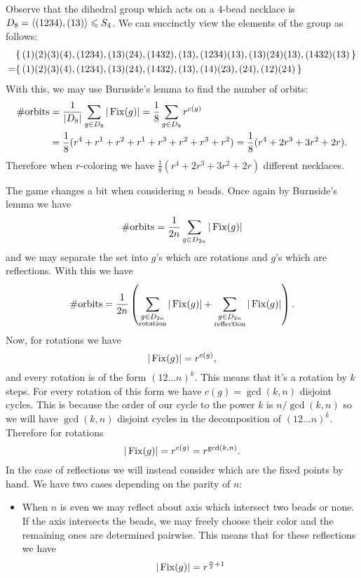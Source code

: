 \documentclass[12pt]{memoir}
\begin{document}
\begin{ptcbr}
 Observe that the dihedral group which acts on a $4$-bead necklace is $D_8=\left\langle (1234),(13)\right\rangle\leqslant S_4$. We can succinctly view the elements of the group as follows:
        \begin{align*}
            &\{\,(1)(2)(3)(4),(1234),(13)(24),(1432),(13),(1234)(13),(13)(24)(13),(1432)(13)\,\}\\
            =&\{\,(1)(2)(3)(4),(1234),(13)(24),(1432),(13),(14)(23),(24),(12)(24)\,\}
        \end{align*}
        With this, we may use Burnside's lemma to find the number of orbits:
        \begin{align*}
        \#\text{orbits}&=\frac{1}{|D_8|}\sum_{g\in D_{8}}|\operatorname{Fix}(g)|=\frac{1}{8}\sum_{g\in D_{8}}r^{c(g)}\\
        &=\frac{1}{8}(r^4+r^1+r^2+r^1+r^3+r^2+r^3+r^2)
        =\frac{1}{8}(r^4+2r^3+3r^2+2r).
        \end{align*}
Therefore when $r$-coloring we have $\frac{1}{8}(r^4+2r^3+3r^2+2r)$ different necklaces.\par 
The game changes a bit when considering $n$ beads. Once again by Burnside's lemma we have 
$$\#\text{orbits}=\frac{1}{2n}\sum_{g\in D_{2n}}|\operatorname{Fix}(g)|$$
and we may separate the set into $g$'s which are rotations and $g$'s which are reflections. With this we have 
$$\#\text{orbits}=\frac{1}{2n}\left(\sum_{\substack{g\in D_{2n}\\\text{rotation}}}|\operatorname{Fix}(g)|+\sum_{\substack{g\in D_{2n}\\\text{reflection}}}|\operatorname{Fix}(g)|\right).$$
Now, for rotations we have 
$$|\operatorname{Fix}(g)|=r^{c(g)},$$
and every rotation is of the form $(12\dots n)^k$. This means that it's a rotation by $k$ steps. For every rotation of this form we have $c(g)=\gcd(k,n)$ disjoint cycles. This is because the order of our cycle to the power $k$ is $n/\gcd(k,n)$ so we will have $\gcd(k,n)$ disjoint cycles in the decomposition of $(12\dots n)^k$. Therefore for rotations 
$$|\operatorname{Fix}(g)|=r^{c(g)}=r^{\gcd(k,n)}.$$
In the case of reflections we will instead consider which are the fixed points by hand. We have two cases depending on the parity of $n$:
\begin{itemize}
    \itemsep=-0.4em 
    \item When $n$ is even we may reflect about axis which intersect two beads or none. If the axis intersects the beads, we may freely choose their color and the remaining ones are determined pairwise. This means that for these reflections we have 
    $$|\operatorname{Fix}(g)|=r^{\frac{n}{2}+1}$$

\end{itemize}
\end{ptcbr}
\end{document}
